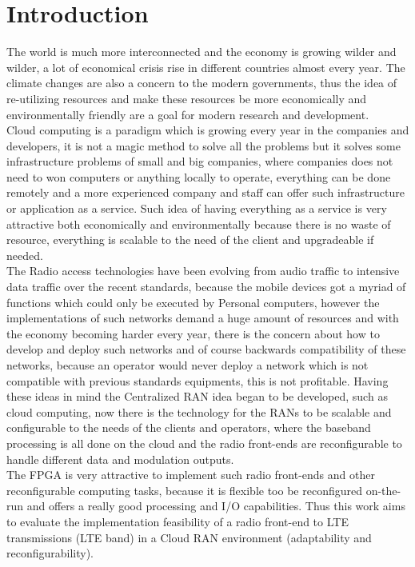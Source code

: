 \chapter{Introduction}
\label{chap:intro}

The world is much more interconnected and the economy is growing wilder and
wilder, a lot of economical crisis rise in different countries almost every
year. The climate changes are also a concern to the modern governments, thus the
idea of re-utilizing resources and  make these resources be more economically
and environmentally friendly are a goal for modern research and development.\\

Cloud computing is a paradigm which is growing every year in the companies and
developers, it is not a magic method to solve all the problems but it solves
some infrastructure problems of small and big companies, where companies does
not need to won computers or anything locally to operate, everything can be done
remotely and a more experienced company and staff can offer such infrastructure
or application as a service. Such idea of having everything as a service is very
attractive both economically  and environmentally because there is no waste of
resource, everything is scalable to the need of the client and upgradeable if
needed.\\

The Radio access technologies have been evolving from audio traffic to
intensive data traffic over the recent standards, because the mobile devices
got a myriad of functions which could only be executed by Personal computers,
however the implementations of such networks demand a huge amount of resources
and with the economy becoming harder every year, there is the concern about how
to develop and deploy such networks and of course backwards compatibility of
these networks, because an operator would never deploy a network which is not
compatible with previous standards equipments, this is not profitable. Having
these ideas in mind the Centralized RAN idea began to be developed, such as
cloud computing, now there is the technology for the RANs to be scalable and
configurable to the needs of the clients and operators, where the baseband
processing is all done on the cloud and the radio front-ends are reconfigurable
to handle different data and modulation outputs.\\

The FPGA is very attractive to implement such radio front-ends and other
reconfigurable computing tasks, because it is flexible too be reconfigured
on-the-run and offers a really good processing and I/O capabilities. Thus this
work aims to evaluate the implementation feasibility of a radio front-end to
LTE transmissions (LTE band) in a Cloud RAN environment (adaptability and
reconfigurability).\\

